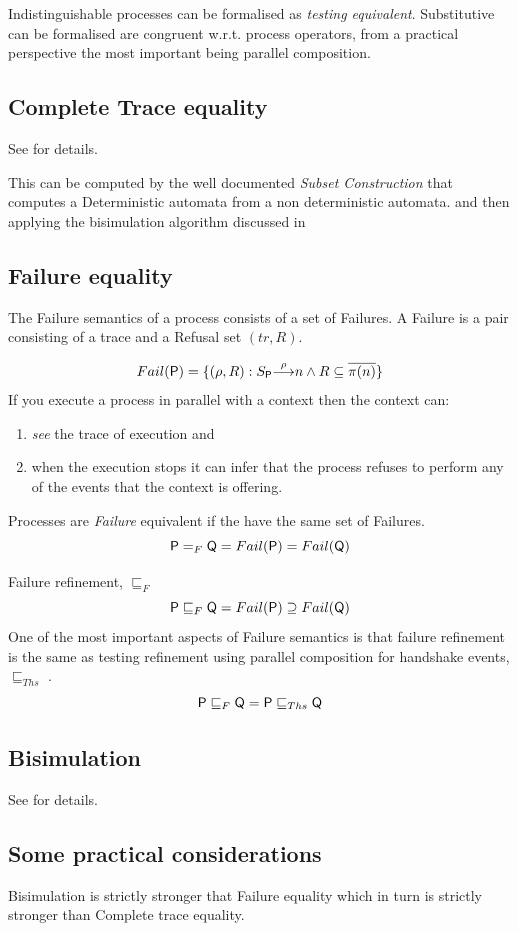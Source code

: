\documentclass[]{article}
\begin{document}
Indistinguishable processes  can be formalised as \emph{testing equivalent}. Substitutive can be formalised are congruent w.r.t. process operators, from a practical perspective the most important being parallel composition.
 
 
 \subsection{Complete Trace equality}
 See  for details.
 
 This can be computed by the well documented \emph{Subset Construction} that computes a Deterministic automata from a non deterministic automata. and then applying the  bisimulation  algorithm discussed in 
 
 \subsection{Failure equality}
 The Failure semantics of a process consists of a set of Failures. A Failure  is a pair consisting of a trace and a Refusal set $(tr,R)$.
 
 \[ Fail({\sf P}) = \{(\rho ,R) : {S_{\sf P}}{\stackrel{\rho}{\longrightarrow}}{n}  \land R \subseteq \overline{ \pi(n) } \}\]
 If you execute a process in parallel with a context then the context can:
 \begin{enumerate}
 \item \emph{see} the trace of execution and
 \item when the execution stops it can infer that the process refuses to perform any of the events that the context is offering.
 \end{enumerate}    
 Processes are \emph{Failure} equivalent if the have the same set of Failures.
 \[{\sf P}=_F{\sf Q} = Fail({\sf P}) = Fail({\sf Q})\]
 
 Failure refinement, $\sqsubseteq_F$ 
  \[{\sf P}\sqsubseteq_F{\sf Q} = Fail({\sf P}) \supseteq Fail({\sf Q})\]
One of the most important aspects of Failure semantics is that failure refinement is the same as testing refinement using parallel composition for handshake events, $\sqsubseteq_{Ths}$ .
  \[{\sf P}\sqsubseteq_F{\sf Q} = {\sf P}\sqsubseteq_{Ths}{\sf Q} \]
 
 
 \subsection{Bisimulation}
  See   for details.
  
 \subsection{Some practical considerations}
 Bisimulation is strictly stronger that Failure equality which in turn is strictly stronger than Complete trace equality.
 
\end{document}

